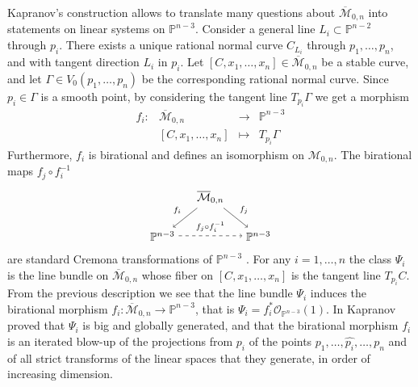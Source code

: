 \documentclass[a4paper,10pt]{amsart}
\theoremstyle{definition}
\renewcommand{\P}{\mathbb{P}}
\newcommand{\cM}{\overline{\mathcal{M}}}
\begin{document}
Kapranov's construction allows to translate many questions about $\cM_{0,n}$ into statements on linear systems on $\P^{n-3}$. Consider a general line $L_{i}\subset\mathbb{P}^{n-2}$ through $p_{i}$. There exists a unique rational normal curve $C_{L_{i}}$ through $p_{1},\dots,p_{n}$, and with tangent direction $L_{i}$ in $p_{i}$. Let $[C,x_{1},\dots,x_{n}]\in\cM_{0,n}$ be a stable curve, and let $\Gamma\in V_0(p_{1},\dots,p_{n})$ be the corresponding rational normal curve. Since $p_{i}\in\Gamma$ is a smooth point, by considering the tangent line $T_{p_{i}}\Gamma$ we get a morphism 
\begin{equation}\label{KapMor}
\begin{array}{cccc}
f_i: & \cM_{0,n} & \longrightarrow & \mathbb{P}^{n-3}\\
 & [C,x_{1},\dots,x_{n}] & \longmapsto & T_{p_{i}}\Gamma
\end{array}
\end{equation}
Furthermore, $f_{i}$ is birational and defines an isomorphism on $\mathcal{M}_{0,n}$. The birational maps $f_j\circ f_i^{-1}$
  \[
  \begin{tikzpicture}[xscale=1.5,yscale=-1.2]
    \node (A0_1) at (1, 0) {$\cM_{0,n}$};
    \node (A1_0) at (0, 1) {$\mathbb{P}^{n-3}$};
    \node (A1_2) at (2, 1) {$\mathbb{P}^{n-3}$};
    \path (A1_0) edge [->,dashed]node [auto] {$\scriptstyle{f_{j}\circ f_{i}^{-1}}$} (A1_2);
    \path (A0_1) edge [->]node [auto] {$\scriptstyle{f_{j}}$} (A1_2);
    \path (A0_1) edge [->]node [auto,swap] {$\scriptstyle{f_{i}}$} (A1_0);
  \end{tikzpicture}
  \]
are standard Cremona transformations of $\mathbb{P}^{n-3}$ \cite[Proposition 2.12]{Ka}. For any $i = 1,\dots,n$ the class $\Psi_{i}$ is the line bundle on $\cM_{0,n}$ whose fiber on $[C,x_{1},\dots,x_{n}]$ is the tangent line $T_{p_{i}}C$. From the previous description we see that the line bundle $\Psi_{i}$ induces the birational morphism $f_{i}:\cM_{0,n}\rightarrow\mathbb{P}^{n-3}$, that is $\Psi_{i} = f_{i}^{*}\mathcal{O}_{\mathbb{P}^{n-3}}(1)$. In \cite{Ka} Kapranov proved that $\Psi_{i}$ is big and globally generated, and that the birational morphism $f_{i}$ is an iterated blow-up of the projections from $p_{i}$ of the points $p_{1},\dots,\hat{p_{i}},\dots,p_{n}$ and of all strict transforms of the linear spaces that they generate, in order of increasing dimension. 
\end{document}
